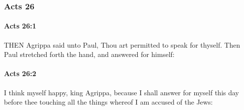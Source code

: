 	\subsubsection{Acts 26} %
		\label{ACTS-26}
		
		\paragraph{Acts 26:1} %
			\label{ACTS-26-1}

			THEN Agrippa said unto Paul, Thou art permitted to speak for thyself.  Then Paul stretched forth the hand, and answered for himself:

			\begin{framed}
			\scriptsize
				\begin{compactdesc}
					\item[SBLG] 
				\end{compactdesc}
			\end{framed}

		\paragraph{Acts 26:2} %
			\label{ACTS-26-2}

			I think myself happy, king Agrippa, because I shall answer for myself this day before thee touching all the things whereof I am accused of the Jews:

